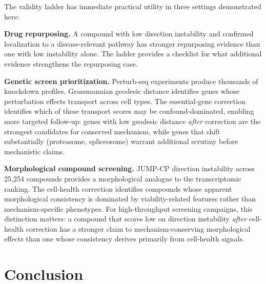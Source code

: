 \documentclass{article}
\begin{document}
The validity ladder has immediate practical utility in three settings
demonstrated here:

\textbf{Drug repurposing.} A compound with low direction instability and
confirmed localization to a disease-relevant pathway has stronger repurposing
evidence than one with low instability alone. The ladder provides a checklist
for what additional evidence strengthens the repurposing case.

\textbf{Genetic screen prioritization.} Perturb-seq experiments produce
thousands of knockdown profiles. Grassmannian geodesic distance identifies
genes whose perturbation effects transport across cell types. The
essential-gene correction identifies which of these transport scores may be
confound-dominated, enabling more targeted follow-up: genes with low
geodesic distance \emph{after} correction are the strongest candidates for
conserved mechanism, while genes that shift substantially (proteasome,
spliceosome) warrant additional scrutiny before mechanistic claims.

\textbf{Morphological compound screening.} JUMP-CP direction instability
across 25{,}254 compounds provides a morphological analogue to the
transcriptomic ranking. The cell-health correction identifies compounds
whose apparent morphological consistency is dominated by viability-related
features rather than mechanism-specific phenotypes. For high-throughput
screening campaigns, this distinction matters: a compound that scores low
on direction instability \emph{after} cell-health correction has a stronger
claim to mechanism-conserving morphological effects than one whose
consistency derives primarily from cell-health signals.

\section{Conclusion}
\end{document}
